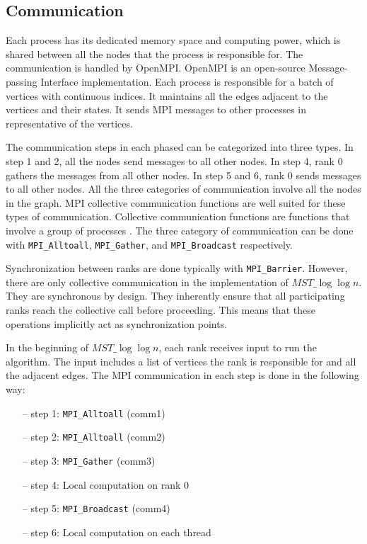 \documentclass[english, 12pt, a4paper, elec, utf8, a-2b, online]{aaltothesis}
\newcommand{\mstalgo}{$MST\_\log\log{n}$}
\begin{document}
\subsection{Communication}
Each process has its dedicated memory space and computing power, which is shared between all the nodes that the process is responsible for. 
The communication is handled by OpenMPI. OpenMPI is an open-source Message-passing Interface implementation. 
Each process is responsible for a batch of vertices with continuous indices. It maintains all the edges adjacent to the vertices and their states. It sends MPI messages to other processes in representative of the vertices. 

The communication steps in each phased can be categorized into three types. In step 1 and 2, all the nodes send messages to all other nodes. In step 4, rank 0 gathers the messages from all other nodes. In step 5 and 6, rank 0 sends messages to all other nodes.
All the three categories of communication involve all the nodes in the graph. MPI collective communication functions are well suited for these types of communication. Collective communication functions are functions that involve a group of processes \cite{MPI}.
The three category of communication can be done with \texttt{MPI\_Alltoall}, \texttt{MPI\_Gather}, and \texttt{MPI\_Broadcast} respectively.

Synchronization between ranks are done typically with \texttt{MPI\_Barrier}. However, there are only collective communication in the implementation of \mstalgo{}. They are synchronous by design. They inherently ensure that all participating ranks reach the collective call before proceeding. This means that these operations implicitly act as synchronization points. \cite{MPI}

In the beginning of \mstalgo{}, each rank receives input to run the algorithm. The input includes a list of vertices the rank is responsible for and all the adjacent edges. The MPI communication in each step is done in the following way:
\begin{itemize}
	\item[--] step 1: \texttt{MPI\_Alltoall} (comm1)
	\item[--] step 2: \texttt{MPI\_Alltoall} (comm2)
	\item[--] step 3: \texttt{MPI\_Gather} (comm3)
	\item[--] step 4: Local computation on rank 0
	\item[--] step 5: \texttt{MPI\_Broadcast} (comm4)
	\item[--] step 6: Local computation on each thread
\end{itemize}
\end{document}

